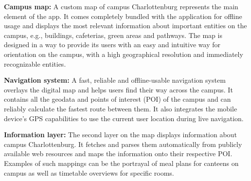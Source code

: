 \textbf{Campus map:} A custom map of campus Charlottenburg represents the main element of the app. It comes completely bundled with the application for offline usage and displays the most relevant information about important entities on the campus, e.g., buildings, cafeterias, green areas and pathways. The map is designed in a way to provide its users with an easy and intuitive way for orientation on the campus, with a high geographical resolution and immediately recognizable entities.

\textbf{Navigation system:} A fast, reliable and offline-usable navigation system overlays the digital map and helps users find their way across the campus. It contains all the geodata and points of interest (POI) of the campus and can reliably calculate the fastest route between them. It also integrates the mobile device's GPS capabilities to use the current user location during live navigation.

\textbf{Information layer:} The second layer on the map displays information about campus Charlottenburg. It fetches and parses them automatically from publicly available web resources and maps the information onto their respective POI. Examples of such mappings can be the portrayal of meal plans for canteens on campus as well as timetable overviews for specific rooms.